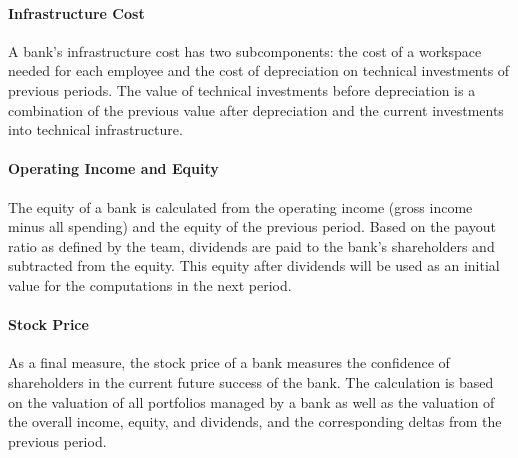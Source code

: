 \paragraph{Infrastructure Cost}
A bank's infrastructure cost has two subcomponents: the cost of a workspace needed for each employee and the cost of depreciation on technical investments of previous periods. The value of technical investments before depreciation is a combination of the previous value after depreciation and the current investments into technical infrastructure.

\paragraph{Operating Income and Equity}
The equity of a bank is calculated from the operating income (gross income minus all spending) and the equity of the previous period. Based on the payout ratio as defined by the team, dividends are paid to the bank's shareholders and subtracted from the equity. This equity after dividends will be used as an initial value for the computations in the next period.

\paragraph{Stock Price}
As a final measure, the stock price of a bank measures the confidence of shareholders in the current future success of the bank. The calculation is based on the valuation of all portfolios managed by a bank as well as the valuation of the overall income, equity, and dividends, and the corresponding deltas from the previous period.
